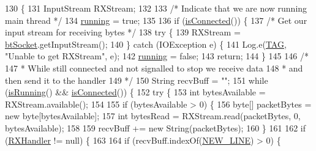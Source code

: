 \begin{DoxyCode}
130                       \{
131         InputStream RXStream;
132 
133         \textcolor{comment}{/* Indicate that we are now running main thread */}
134         \hyperlink{class_android_app_1_1_b_t_connection_ace01a7a97f5d1abccb61a5d6c6ad9295}{running} = \textcolor{keyword}{true};
135 
136         \textcolor{keywordflow}{if} (\hyperlink{class_android_app_1_1_b_t_connection_a1c91fcddfe9f3b69cd0141742103191a}{isConnected}()) \{
137             \textcolor{comment}{/* Get our input stream for receiving bytes */}
138             \textcolor{keywordflow}{try} \{
139                 RXStream = \hyperlink{class_android_app_1_1_b_t_connection_af3cdc6c880b28361d87d0118ace0e49c}{btSocket}.getInputStream();
140             \} \textcolor{keywordflow}{catch} (IOException e) \{
141                 Log.e(\hyperlink{class_android_app_1_1_b_t_connection_ad838024d59c68be866b5db329d6f6230}{TAG}, \textcolor{stringliteral}{"Unable to get RXStream"}, e);
142                 \hyperlink{class_android_app_1_1_b_t_connection_ace01a7a97f5d1abccb61a5d6c6ad9295}{running} = \textcolor{keyword}{false};
143                 \textcolor{keywordflow}{return};
144             \}
145 
146             \textcolor{comment}{/*}
147 \textcolor{comment}{             * While still connected and not signalled to stop we receive data}
148 \textcolor{comment}{             * and then send it to the handler}
149 \textcolor{comment}{             */}
150             String recvBuff = \textcolor{stringliteral}{""};
151             \textcolor{keywordflow}{while} (\hyperlink{class_android_app_1_1_b_t_connection_a88abb39350aef278f15e54be4d0d1df3}{isRunning}() && \hyperlink{class_android_app_1_1_b_t_connection_a1c91fcddfe9f3b69cd0141742103191a}{isConnected}()) \{
152                 \textcolor{keywordflow}{try} \{
153                     \textcolor{keywordtype}{int} bytesAvailable = RXStream.available();
154 
155                     \textcolor{keywordflow}{if} (bytesAvailable > 0) \{
156                         byte[] packetBytes = \textcolor{keyword}{new} byte[bytesAvailable];
157                         \textcolor{keywordtype}{int} bytesRead = RXStream.read(packetBytes, 0, bytesAvailable);
158 
159                         recvBuff += \textcolor{keyword}{new} String(packetBytes);
160                     \}
161 
162                     \textcolor{keywordflow}{if} (\hyperlink{class_android_app_1_1_b_t_connection_a4e3bfea96a4ddbd2cd2b76bb4ce8b871}{RXHandler} != null) \{
163 
164                         \textcolor{keywordflow}{if} (recvBuff.indexOf(\hyperlink{class_android_app_1_1_b_t_connection_afe2f59edec0610e765222e02ab350e84}{NEW\_LINE}) > 0) \{

\end{DoxyCode}
